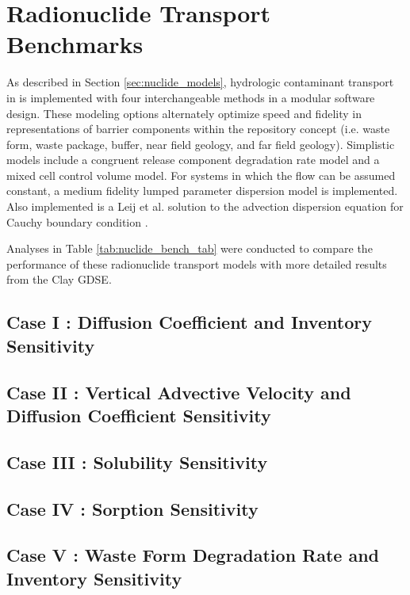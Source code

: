 \section{Radionuclide Transport Benchmarks}\label{sec:nuclide_benchmarks}

As described in Section \ref{sec:nuclide_models}, hydrologic contaminant 
transport in \Cyder is implemented with four interchangeable  methods in a 
modular software design. These modeling options alternately optimize speed and 
fidelity in representations of barrier components within the repository concept 
(i.e. waste form, waste package, buffer, near field geology, and far field 
geology)\cite{huff_hydrologic_2013}.  Simplistic models include a congruent 
release component degradation rate model and a mixed cell control volume model. For 
systems in which the flow can be assumed constant, a medium fidelity lumped 
parameter dispersion model is implemented. Also implemented is a Leij et al. 
solution to the advection dispersion equation for Cauchy boundary condition 
\cite{leij_analytical_1991, van_genuchten_analytical_1982}.  

Analyses in Table \ref{tab:nuclide_bench_tab} were conducted to compare the 
performance of these radionuclide transport models with more detailed results from the 
Clay \gls{GDSE}. 




\subsection{Case I : Diffusion Coefficient and Inventory Sensitivity}

\subsection{Case II : Vertical Advective Velocity and Diffusion Coefficient Sensitivity}

\subsection{Case III : Solubility Sensitivity}

\subsection{Case IV : Sorption Sensitivity}

\subsection{Case V : Waste Form Degradation Rate and Inventory Sensitivity}

%
